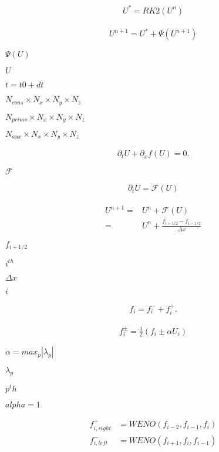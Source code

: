 \documentclass{article}
\begin{document}
\begin{align} U^* = RK2(U^n) \end{align}
\pagebreak

\begin{align} U^{n+1} = U^* + \Psi(U^{n+1}) \end{align}
\pagebreak

$\Psi(U)$
\pagebreak

$U$
\pagebreak

$t=t0 + dt$
\pagebreak

$N_{cons} \times N_x \times N_y \times N_z$
\pagebreak

$N_{prims} \times N_x \times N_y \times N_z$
\pagebreak

$N_{aux} \times N_x \times N_y \times N_z$
\pagebreak

\begin{align} \partial_t U + \partial_x f(U) = 0. \end{align}
\pagebreak

$\mathcal{F}$
\pagebreak

\begin{align} \partial_t U = \mathcal{F}(U) \end{align}
\pagebreak

\begin{align} U^{n+1} =& U^n + \mathcal{F}(U) \\ =& U^n + \frac{f_{i+1/2} - f_{i-1/2}}{\Delta x} \end{align}
\pagebreak

$f_{i+1/2}$
\pagebreak

$i^{th}$
\pagebreak

$\Delta x$
\pagebreak

$i$
\pagebreak

\begin{align} f_i = f_i^- + f_i^+. \end{align}
\pagebreak

\begin{align} f_i^{\pm} = \frac{1}{2}(f_i \pm \alpha U_i) \end{align}
\pagebreak

$\alpha = max_p|\lambda_p|$
\pagebreak

$\lambda_p$
\pagebreak

$p^th$
\pagebreak

$alpha=1$
\pagebreak

\begin{align} f^+_{i, right} &= WENO(f_{i-2}, f_{i-1}, f_i) \\ f^-_{i, left} &= WENO(f_{i+1}, f_i, f_{i-1}) \end{align}
\pagebreak
\end{document}
